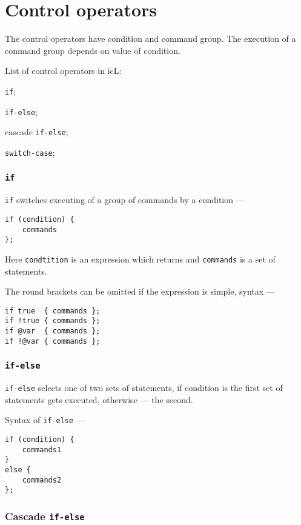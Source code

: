 \section{Control operators}

The control operators have condition and command group. The execution of a command group depends on value of condition.
 
 List of control operators in icL:
\begin{icItems}
	\item \texttt{if};
	\item \texttt{if-else};
	\item cascade \texttt{if-else};
	\item \texttt{switch-case};
\end{icItems}

\subsubsection{\texttt{if}}

\texttt{if} switches executing of a group of commands by a condition —
\begin{verbatim}
if (condition) {
	commands
};
\end{verbatim}
Here \texttt{condtition} is an expression which returns \bool{} and \texttt{commands} is a set of statements.

The round brackets can be omitted if the expression is simple, syntax —
\begin{verbatim}
if true  { commands };
if !true { commands };
if @var  { commands };
if !@var { commands };
\end{verbatim}

\subsubsection{\texttt{if-else}}

\texttt{if-else} selects one of two sets of statements, if condition is \true{} the first set of statements gets executed, otherwise — the second.

Syntax of \texttt{if-else} —
\begin{verbatim}
if (condition) {
	commands1
}
else {
	commands2
};
\end{verbatim}

\subsubsection{Cascade \texttt{if-else}}

